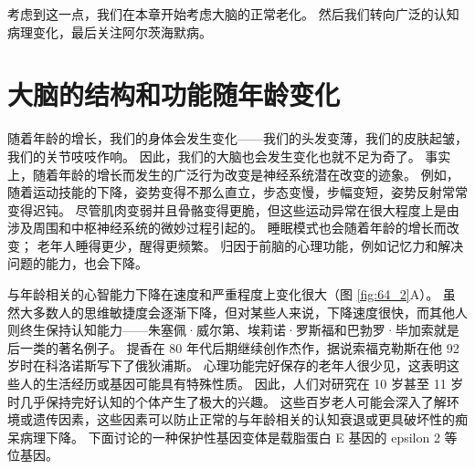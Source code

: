 考虑到这一点，我们在本章开始考虑大脑的正常老化。
然后我们转向广泛的认知病理变化，最后关注阿尔茨海默病。



\section{大脑的结构和功能随年龄变化}

随着年龄的增长，我们的身体会发生变化——我们的头发变薄，我们的皮肤起皱，我们的关节吱吱作响。
因此，我们的大脑也会发生变化也就不足为奇了。
事实上，随着年龄的增长而发生的广泛行为改变是神经系统潜在改变的迹象。
例如，随着运动技能的下降，姿势变得不那么直立，步态变慢，步幅变短，姿势反射常常变得迟钝。
尽管肌肉变弱并且骨骼变得更脆，但这些运动异常在很大程度上是由涉及周围和中枢神经系统的微妙过程引起的。
睡眠模式也会随着年龄的增长而改变；
老年人睡得更少，醒得更频繁。
归因于前脑的心理功能，例如记忆力和解决问题的能力，也会下降。


与年龄相关的心智能力下降在速度和严重程度上变化很大（图 \ref{fig:64_2}A）。
虽然大多数人的思维敏捷度会逐渐下降，但对某些人来说，下降速度很快，而其他人则终生保持认知能力——朱塞佩·威尔第、埃莉诺·罗斯福和巴勃罗·毕加索就是后一类的著名例子。
提香在 80 年代后期继续创作杰作，据说索福克勒斯在他 92 岁时在科洛诺斯写下了俄狄浦斯。
心理功能完好保存的老年人很少见，这表明这些人的生活经历或基因可能具有特殊性质。
因此，人们对研究在 10 岁甚至 11 岁时几乎保持完好认知的个体产生了极大的兴趣。
这些百岁老人可能会深入了解环境或遗传因素，这些因素可以防止正常的与年龄相关的认知衰退或更具破坏性的痴呆病理下降。
下面讨论的一种保护性基因变体是载脂蛋白 E 基因的 epsilon 2 等位基因。


